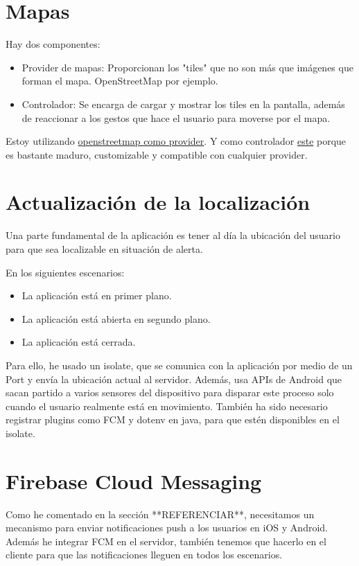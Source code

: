 \section{Mapas}

Hay dos componentes:
 \begin{itemize}
   \item Provider de mapas: Proporcionan los "tiles" que no son más que imágenes que forman el mapa. OpenStreetMap por ejemplo.
   \item Controlador: Se encarga de cargar y mostrar los tiles en la pantalla, además de reaccionar a los gestos que hace el usuario para moverse por el mapa. 
 \end{itemize}

 Estoy utilizando \href{https://wiki.openstreetmap.org/wiki/Tiles}{openstreetmap como provider}. Y como controlador \href{https://pub.dev/packages/map}{este} porque es bastante maduro, customizable y compatible con cualquier provider.

\section{Actualización de la localización}
Una parte fundamental de la aplicación es tener al día la ubicación del usuario para que sea localizable en situación de alerta.

En los siguientes escenarios:
\begin{itemize}
	\item La aplicación está en primer plano.
	\item La aplicación está abierta en segundo plano.
	\item La aplicación está cerrada.
\end{itemize}

Para ello, he usado un isolate, que se comunica con la aplicación por medio de un Port y envía la ubicación actual al servidor.
Además, usa APIs de Android que sacan partido a varios sensores del dispositivo para disparar este 
proceso solo cuando el usuario realmente está en movimiento.
También ha sido necesario registrar plugins como FCM y dotenv en java, para que estén disponibles en el isolate.

\section{Firebase Cloud Messaging}
Como he comentado en la sección **REFERENCIAR**, necesitamos un mecanismo para enviar notificaciones push a los usuarios en iOS y Android.
Además he integrar FCM en el servidor, también tenemos que hacerlo en el cliente para que las notificaciones lleguen en todos los escenarios.

